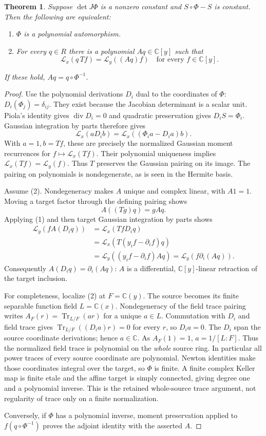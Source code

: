 \documentclass[11pt]{article}
\newtheorem{theorem}{Theorem}
\begin{document}
\begin{theorem}
Suppose $\det J\Phi$ is a nonzero constant and $S\circ\Phi-S$ is constant.
Then the following are equivalent:
\begin{enumerate}
\item $\Phi$ is a polynomial automorphism.
\item For every $q\in R$ there is a polynomial $Aq\in\mathbb C[y]$ such that
\[
 \mathcal L_x(q\,Tf)=\mathcal L_y((Aq)f)\quad\text{for every }f\in\mathbb C[y].
\]
\end{enumerate}
If these hold, $Aq=q\circ\Phi^{-1}$.
\end{theorem}
\begin{proof}
Use the polynomial derivations $D_i$ dual to the coordinates of $\Phi$:
$D_i(\Phi_j)=\delta_{ij}$. They exist because the Jacobian determinant is
a scalar unit. Piola's identity gives $\operatorname{div}D_i=0$ and
quadratic preservation gives $D_iS=\Phi_i$. Gaussian integration by parts
therefore gives
\[
 \mathcal L_x(aD_ib)=\mathcal L_x((\Phi_i a-D_i a)b).
 \tag{1}
\]
With $a=1,b=Tf$, these are precisely the normalized Gaussian moment
recurrences for $f\mapsto\mathcal L_x(Tf)$. Their polynomial uniqueness
implies $\mathcal L_x(Tf)=\mathcal L_y(f)$. Thus $T$ preserves the Gaussian
pairing on its image. The pairing on polynomials is nondegenerate, as is
seen in the Hermite basis.

Assume (2). Nondegeneracy makes $A$ unique and complex linear, with
$A1=1$. Moving a target factor through the defining pairing shows
\[
 A((Tg)q)=gAq.\tag{2}
\]
Applying (1) and then target Gaussian integration by parts shows
\begin{align*}
 \mathcal L_y(f A(D_iq))
 &=\mathcal L_x(Tf D_iq)\\
 &=\mathcal L_x(T(y_i f-\partial_i f)q)\\
 &=\mathcal L_y((y_i f-\partial_i f)Aq)
 =\mathcal L_y(f\partial_i(Aq)).
\end{align*}
Consequently $A(D_iq)=\partial_i(Aq)$: $A$ is a differential,
$\mathbb C[y]$-linear retraction of the target inclusion.

For completeness, localize (2) at $F=\mathbb C(y)$. The source becomes
its finite separable function field $L=\mathbb C(x)$.
Nondegeneracy of the field trace pairing writes
$A_F(r)=\operatorname{Tr}_{L/F}(ar)$ for a unique $a\in L$.
Commutation with $D_i$ and field trace gives
$\operatorname{Tr}_{L/F}((D_i a)r)=0$ for every $r$, so $D_i a=0$.
The $D_i$ span the source coordinate derivations; hence $a\in\mathbb C$.
As $A_F(1)=1$, $a=1/[L:F]$. Thus the normalized field trace is polynomial
on the \emph{whole} source ring. In particular all power traces of every
source coordinate are polynomial. Newton identities make those coordinates
integral over the target, so $\Phi$ is finite. A finite complex Keller map
is finite etale and the affine target is simply connected, giving degree
one and a polynomial inverse. This is the retained whole-source trace
argument, not regularity of trace only on a finite normalization.

Conversely, if $\Phi$ has a polynomial inverse, moment preservation applied
to $f(q\circ\Phi^{-1})$ proves the adjoint identity with the asserted $A$.
\end{proof}
\end{document}
